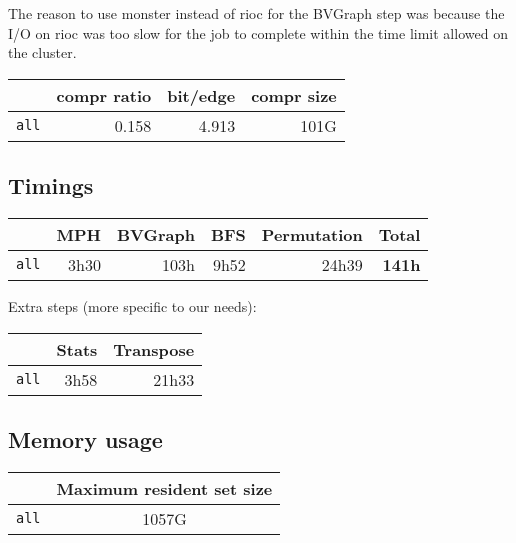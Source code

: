 \documentclass[11pt,a4paper]{article}
\begin{document}
The reason to use monster instead of rioc for the BVGraph step was because the
I/O on rioc was too slow for the job to complete within the time limit allowed
on the cluster.

\begin{center}
    \begin{tabular}{@{} l *3r @{}}
        \toprule
        \multicolumn{1}{c}{} &
            \textbf{compr ratio} & \textbf{bit/edge} & \textbf{compr size} \\
        \midrule
        \texttt{all} & 0.158 & 4.913 & 101G \\
        \bottomrule
    \end{tabular}
\end{center}

\subsection{Timings}

\begin{center}
    \begin{tabular}{@{} l *5r @{}}
        \toprule
        \multicolumn{1}{c}{} &
            \textbf{MPH} &
            \textbf{BVGraph} &
            \textbf{BFS} &
            \textbf{Permutation} &
            \textbf{Total} \\
        \midrule
        \texttt{all}
            & 3h30 & 103h & 9h52 & 24h39 & \textbf{141h} \\
        \bottomrule
    \end{tabular}
\end{center}

Extra steps (more specific to our needs):

\begin{center}
    \begin{tabular}{@{} l *2r @{}}
        \toprule
        \multicolumn{1}{c}{} &
            \textbf{Stats} &
            \textbf{Transpose} \\
        \midrule
        \texttt{all}
            & 3h58 & 21h33 \\
        \bottomrule
    \end{tabular}
\end{center}

\subsection{Memory usage}

\begin{center}
    \begin{tabular}{@{} l c @{}}
        \toprule
        \multicolumn{1}{c}{} &
            \textbf{Maximum resident set size} \\
        \midrule
        \texttt{all} & 1057G \\
        \bottomrule
    \end{tabular}
\end{center}
\end{document}
